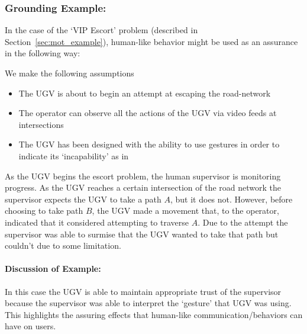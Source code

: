 %

\subsubsection{Grounding Example:}
In the case of the `VIP Escort' problem (described in Section~\ref{sec:mot_example}), human-like behavior might be used as an assurance in the following way:

We make the following assumptions

\begin{itemize}
    \item The UGV is about to begin an attempt at escaping the road-network
    \item The operator can observe all the actions of the UGV via video feeds at intersections
    \item The UGV has been designed with the ability to use gestures in order to indicate its `incapability' as in \cite{Kwon2018-xt}
\end{itemize}

As the UGV begins the escort problem, the human supervisor is monitoring progress. As the UGV reaches a certain intersection of the road network the supervisor expects the UGV to take a path $A$, but it does not. However, before choosing to take path $B$, the UGV made a movement that, to the operator, indicated that it considered attempting to traverse $A$. Due to the attempt the supervisor was able to surmise that the UGV wanted to take that path but couldn't due to some limitation.

\paragraph{\textbf{Discussion of Example:}} In this case the UGV is able to maintain appropriate trust of the supervisor because the supervisor was able to interpret the `gesture' that UGV was using. This highlights the assuring effects that human-like communication/behaviors can have on users.
